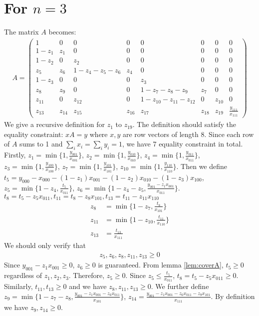 \documentclass{article}
\begin{document}
\section{For $n=3$}
The matrix $A$ becomes:
\begin{align*}
    A = \begin{pmatrix}
    1 & 0 & 0 & 0 & 0 & 0 & 0 & 0\\
    1-z_1 & z_1 & 0 & 0 & 0 & 0 & 0 & 0\\
    1-z_2 & 0 & z_2 & 0 & 0 & 0 & 0 & 0\\
    z_5 & z_6 & 1 - z_4 - z_5 - z_6 & z_4 & 0 & 0 & 0 & 0 \\
    1-z_3 & 0 & 0 & 0 & z_3 & 0 & 0 & 0\\
    z_8 & z_9 & 0 & 0 & 1-z_7 - z_8 - z_9 & z_7 & 0 & 0 \\
    z_{11} & 0 & z_{12} & 0 & 1-z_{10} - z_{11}-z_{12} & 0 & z_{10} & 0 \\
    z_{13} & z_{14} & z_{15} & z_{16} & z_{17} & z_{18} & z_{19} & \frac{y_{111}}{x_{111}}
    \end{pmatrix}
\end{align*}
    We give a recursive definition for $z_1$ to $z_{19}$.
    The definition should satisfy the equality constraint:
    $x A  = y$ where $x,y$ are row vectors of length 8.
    Since each row of $A$ sums to 1 and $\sum_i x_i = \sum_i y_i = 1$, we have 7 equality constraint in total.
    Firstly, $z_1 = \min\{1,\frac{y_{001}}{x_{001}}\}$,
    $z_2 = \min\{1,\frac{y_{010}}{x_{010}}\}$,
    $z_4 = \min\{1,\frac{y_{011}}{x_{011}}\}$,
    $z_3 = \min\{1,\frac{y_{100}}{x_{100}}\}$,
    $z_7 = \min\{1,\frac{y_{101}}{x_{101}}\}$,
    $z_{10} = \min\{1,\frac{y_{110}}{x_{110}}\}$.
    Then we define
    $t_5=y_{000} - x_{000} - (1-z_1)x_{001} - (1-z_2)x_{010} - (1-z_3) x_{100}$,
    $z_5 = \min\{1-z_4, \frac{t_5}{x_{011}}\}$, $z_6 = \min\{1-z_4 -z_5,\frac{y_{001}-z_1x_{001}}{x_{011}}\}$.
    $t_8 = t_5 -z_5x_{011}, t_{11} = t_8 - z_8x_{101}, t_{13} = t_{11} - z_{11} x_{110}$
    \begin{align*}
    z_8 &= \min\{1-z_{7}, \frac{t_8}{x_{101}}\} \\
    z_{11} &= \min\{1-z_{10}, \frac{t_{11}}{x_{110}}\} \\
    z_{13} &=  \frac{t_{13}}{x_{111}}
    \end{align*}
    We should only verify that
    \begin{align*}
        z_5,z_6,z_{8},z_{11},z_{13} \geq 0
    \end{align*}
    Since $y_{001} - z_1 x_{001} \geq 0$, $z_6 \geq 0$
    is guaranteed. From lemma \ref{lem:coverA},
    $ t_5 \geq 0$ regardless of $z_1, z_2, z_3$. Therefore,
    $z_5 \geq 0$. Since $z_5 \leq \frac{t_5}{x_{011}}$, $t_8 = t_5 - z_5 x_{011} \geq 0$. Similarly, $t_{11}, t_{13} \geq 0$ and we have $z_8, z_{11}, z_{13} \geq 0$.
    We further define
    $z_9 = \min\{1-z_7 - z_8,\frac{y_{001} - z_1x_{001} - z_6 x_{011}}{x_{101}} \}$, $z_{14} = \frac{y_{001} - z_1x_{001} - z_6 x_{011} - z_9 x_{101}}{x_{111}}$.
    By definition we have $z_9, z_{14} \geq 0$.
    
\end{document}
